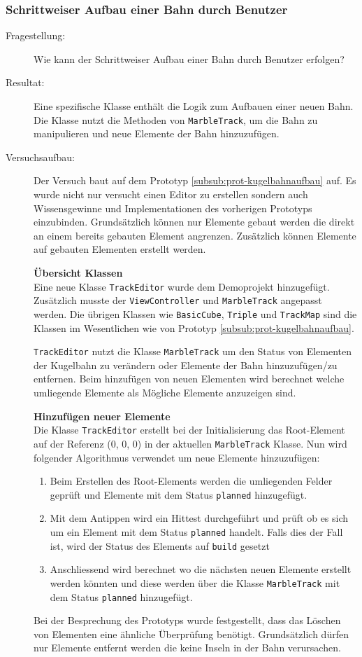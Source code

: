 \subsubsection{Schrittweiser Aufbau einer Bahn durch Benutzer}\label{subsub:prot-kugelbahneditor}
\begin{description}
	\item[Fragestellung:] Wie kann der Schrittweiser Aufbau einer Bahn durch Benutzer erfolgen?
	\item[Resultat:] Eine spezifische Klasse enthält die Logik zum Aufbauen einer neuen Bahn. Die Klasse nutzt die Methoden von \texttt{MarbleTrack}, um die Bahn zu manipulieren und neue Elemente der Bahn hinzuzufügen.
	\item[Versuchsaufbau:] Der Versuch baut auf dem Prototyp \ref{subsub:prot-kugelbahnaufbau} auf. Es wurde nicht nur versucht einen Editor zu erstellen sondern auch Wissensgewinne und Implementationen des vorherigen Prototyps einzubinden. Grundsätzlich können nur Elemente gebaut werden die direkt an einem bereits gebauten Element angrenzen. Zusätzlich können Elemente auf gebauten Elementen erstellt werden. 

	\textbf{Übersicht Klassen}\\
	Eine neue Klasse \texttt{TrackEditor} wurde dem Demoprojekt hinzugefügt. Zusätzlich musste der \texttt{ViewController} und \texttt{MarbleTrack} angepasst werden. Die übrigen Klassen wie \texttt{BasicCube}, \texttt{Triple} und \texttt{TrackMap} sind die Klassen im Wesentlichen wie von Prototyp \ref{subsub:prot-kugelbahnaufbau}.

	\texttt{TrackEditor} nutzt die Klasse \texttt{MarbleTrack} um den Status von Elementen der Kugelbahn zu verändern oder Elemente der Bahn hinzuzufügen/zu entfernen. Beim hinzufügen von neuen Elementen wird berechnet welche umliegende Elemente als Mögliche Elemente anzuzeigen sind.

	\textbf{Hinzufügen neuer Elemente}\\
	Die Klasse \texttt{TrackEditor} erstellt bei der Initialisierung das Root-Element auf der Referenz (0, 0, 0) in der aktuellen \texttt{MarbleTrack} Klasse. Nun wird folgender Algorithmus verwendet um neue Elemente hinzuzufügen:
	
	\begin{enumerate}
		\item Beim Erstellen des Root-Elements werden die umliegenden Felder geprüft und Elemente mit dem Status \texttt{planned} hinzugefügt.
		\item Mit dem Antippen wird ein Hittest durchgeführt und prüft ob es sich um ein Element mit dem Status \texttt{planned} handelt. Falls dies der Fall ist, wird der Status des Elements auf \texttt{build} gesetzt
		\item Anschliessend wird berechnet wo die nächsten neuen Elemente erstellt werden könnten und diese werden über die Klasse \texttt{MarbleTrack} mit dem Status \texttt{planned} hinzugefügt.
	\end{enumerate}

	Bei der Besprechung des Prototyps wurde festgestellt, dass das Löschen von Elementen eine ähnliche Überprüfung benötigt. Grundsätzlich dürfen nur Elemente entfernt werden die keine Inseln in der Bahn verursachen.

\end{description}
